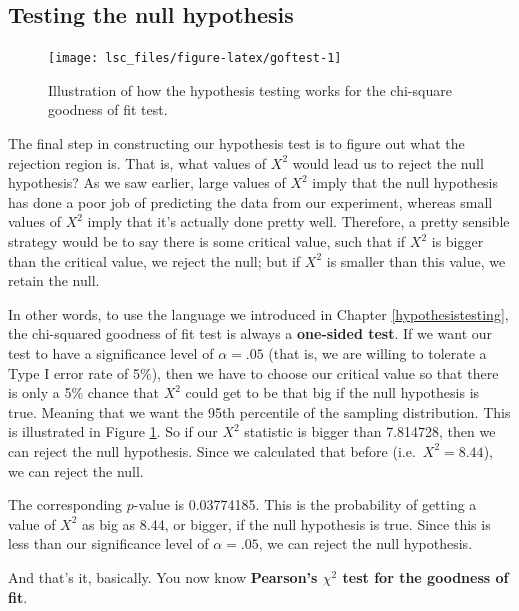 \documentclass[
  11pt,
  a4paper,
  twoside,symmetric,openright]{book}
\theoremstyle{break}
\theoremstyle{break}
\begin{document}
\subsection{Testing the null hypothesis}\label{testing-the-null-hypothesis}

\begin{figure}

{\centering \texttt{[image: lsc\_files/figure-latex/goftest-1]} 

}

\caption{Illustration of how the hypothesis testing works for the chi-square goodness of fit test.}\label{fig:goftest}
\end{figure}

The final step in constructing our hypothesis test is to figure out what the rejection region is. That is, what values of \(X^2\) would lead us to reject the null hypothesis? As we saw earlier, large values of \(X^2\) imply that the null hypothesis has done a poor job of predicting the data from our experiment, whereas small values of \(X^2\) imply that it's actually done pretty well. Therefore, a pretty sensible strategy would be to say there is some critical value, such that if \(X^2\) is bigger than the critical value, we reject the null; but if \(X^2\) is smaller than this value, we retain the null.

In other words, to use the language we introduced in Chapter \ref{hypothesistesting}, the chi-squared goodness of fit test is always a \textbf{one-sided test}. If we want our test to have a significance level of \(\alpha = .05\) (that is, we are willing to tolerate a Type I error rate of 5\%), then we have to choose our critical value so that there is only a 5\% chance that \(X^2\) could get to be that big if the null hypothesis is true. Meaning that we want the 95th percentile of the sampling distribution. This is illustrated in Figure \ref{fig:goftest}. So if our \(X^2\) statistic is bigger than 7.814728, then we can reject the null hypothesis. Since we calculated that before (i.e.~\(X^2 = 8.44\)), we can reject the null.

The corresponding \(p\)-value is 0.03774185. This is the probability of getting a value of \(X^2\) as big as 8.44, or bigger, if the null hypothesis is true. Since this is less than our significance level of \(\alpha = .05\), we can reject the null hypothesis.

And that's it, basically. You now know \textbf{Pearson's \(\chi^2\) test for the goodness of fit}.
\end{document}

